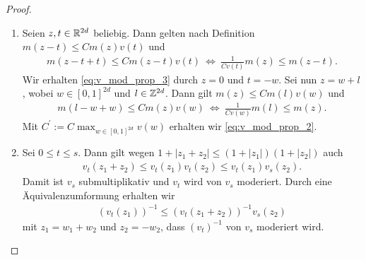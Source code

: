 \begin{proof}
	\begin{enumerate}[label =\textbf{(\roman*)}]
		\item
		Seien $ z,t \in \mathbb{R}^{2d} $ beliebig.
		Dann gelten nach Definition
		$ m(z-t) \leq C m(z) v(t) $ und
		\begin{align*}
		m(z -t + t) \leq C m(z-t) v(t) 
		\ \Leftrightarrow \
		\frac{1}{C v(t)} m(z) \leq m(z-t). 
		\end{align*}
		Wir erhalten \eqref{eq:v_mod_prop_3} durch $ z = 0 $ und $ t = - w $.
		Sei nun $ z = w + l  $, wobei $ w \in [0,1]^{2d} $ und $ l \in \mathbb{Z}^{2d} $.
		Dann gilt $ m(z) \leq C m(l) v(w) $ und
		\begin{align*}
		m(l - w + w) \leq C m(z) v(w)
		\ \Leftrightarrow \
		\frac{1}{C v(w)} m(l) \leq m(z). 
		\end{align*}
		Mit $ C^\prime := C \max_{w \in [0,1]^{2d}} v(w) $ erhalten wir \eqref{eq:v_mod_prop_2}.
		
		\item
		Sei $ 0 \leq t \leq s $. Dann gilt wegen $ 1 + |z_1 + z_2|\leq (1+|z_1|)(1+|z_2|) $ auch
		\begin{align*}
		v_t(z_1 + z_2)
		\leq
		v_t(z_1) v_t(z_2)
		\leq 
		v_t(z_1) v_s(z_2). 
		\end{align*}
		Damit ist $ v_s $ submultiplikativ und $ v_t $ wird von $ v_s $ moderiert.
		Durch eine Äquivalenzumformung erhalten wir
		\begin{align*}
		(v_t(z_1))^{-1} \leq (v_t(z_1 + z_2))^{-1} v_s(z_2)
		\end{align*}
		mit $ z_1 = w_1 + w_2 $ und $ z_2 = -w_2 $, dass $ (v_t)^{-1} $ von $ v_s $ moderiert wird.
		
	\end{enumerate}
\end{proof}

